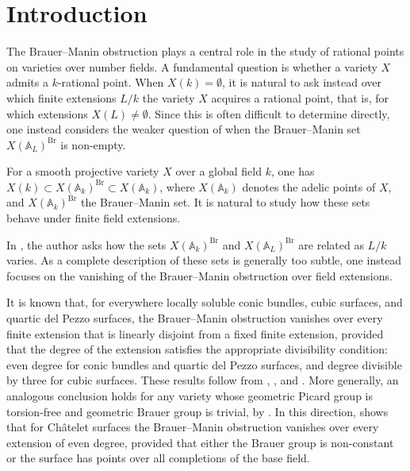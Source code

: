 \documentclass[10pt]{amsart}
\theoremstyle{plain}
\theoremstyle{definition}
\begin{document}
\section{Introduction}\label{Introduction}

The Brauer--Manin obstruction plays a central role in the study of rational points on varieties over number fields. A fundamental question is whether a variety \(X\) admits a \(k\)-rational point. When \(X(k)=\emptyset\), it is natural to ask instead over which finite extensions \(L/k\) the variety \(X\) acquires a rational point, that is, for which extensions \(X(L)\neq\emptyset\). Since this is often difficult to determine directly, one instead considers the weaker question of when the Brauer--Manin set $X(\mathbb{A}_L)^{\mathrm{Br}}$ is non-empty.

For a smooth projective variety $X$ over a global field $k$, one has \(X(k) \subset X(\mathbb{A}_k)^{\mathrm{Br}} \subset X(\mathbb{A}_k)\), where $X(\mathbb{A}_k)$ denotes the adelic points of $X$, and $X(\mathbb{A}_k)^{\mathrm{Br}}$ the Brauer--Manin set. It is natural to study how these sets behave under finite field extensions.

In \cite[Section~4]{Vir}, the author asks how the sets $X(\mathbb{A}_k)^{\mathrm{Br}}$ and $X(\mathbb{A}_L)^{\mathrm{Br}}$ are related as $L/k$ varies. As a complete description of these sets is generally too subtle, one instead focuses on the vanishing of the Brauer--Manin obstruction over field extensions.



It is known that, for everywhere locally soluble conic bundles, cubic surfaces, and quartic del Pezzo surfaces, the Brauer--Manin obstruction vanishes over every finite extension that is linearly disjoint from a fixed finite extension, provided that the degree of the extension satisfies the appropriate divisibility condition: even degree for conic bundles and quartic del Pezzo surfaces, and degree divisible by three for cubic surfaces. These results follow from \cite[Lemma~3.1]{CV}, \cite[Corollary~1]{swD}, and \cite[Lemma~3.4, Remark~2]{CTPoo}. More generally, an analogous conclusion holds for any variety whose geometric Picard group is torsion-free and geometric Brauer group is trivial, by \cite[Corollary~3.4]{CV}. In this direction, \cite[Theorem~1.1]{RW} shows that for Ch\^atelet surfaces the Brauer--Manin obstruction vanishes over every extension of even degree, provided that either the Brauer group is non-constant or the surface has points over all completions of the base field.
\end{document}
